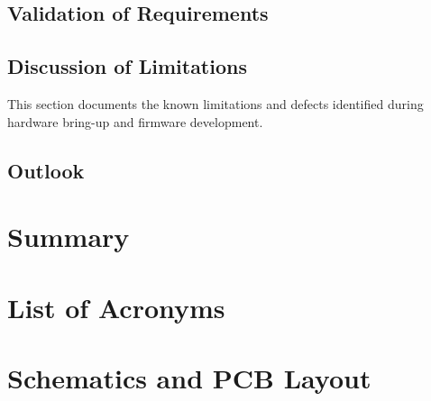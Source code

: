 \documentclass{article}
\begin{document}
\newpage
\subsection{Validation of Requirements}


\newpage
\subsection{Discussion of Limitations}
This section documents the known limitations and defects identified during hardware bring-up and firmware development.


\newpage
\subsection{Outlook}
\label{sec:outlook}


\newpage
\section{Summary}


\newpage
\section*{List of Acronyms}
\printacronyms[heading=none]

\newpage
{}
\printbibliography


\appendix
{}



\section{Schematics and PCB Layout}
\label{app:schematic}


\label{app:pcb-layout}




\end{document}

